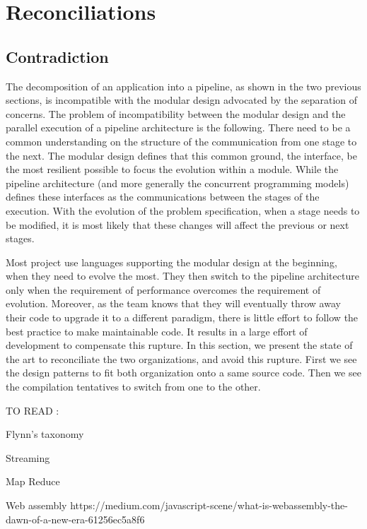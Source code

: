 







\section{Reconciliations} \label{chapter3:reconciliations}

\subsection{Contradiction}

The decomposition of an application into a pipeline, as shown in the two previous sections, is incompatible with the modular design advocated by the separation of concerns.
The problem of incompatibility between the modular design and the parallel execution of a pipeline architecture is the following.
There need to be a common understanding on the structure of the communication from one stage to the next.
The modular design defines that this common ground, the interface, be the most resilient possible to focus the evolution within a module.
While the pipeline architecture (and more generally the concurrent programming models) defines these interfaces as the communications between the stages of the execution.
With the evolution of the problem specification, when a stage needs to be modified, it is most likely that these changes will affect the previous or next stages.

Most project use languages supporting the modular design at the beginning, when they need to evolve the most.
They then switch to the pipeline architecture only when the requirement of performance overcomes the requirement of evolution.
Moreover, as the team knows that they will eventually throw away their code to upgrade it to a different paradigm, there is little effort to follow the best practice to make maintainable code.
It results in a large effort of development to compensate this rupture.
In this section, we present the state of the art to reconciliate the two organizations, and avoid this rupture.
First we see the design patterns to fit both organization onto a same source code.
Then we see the compilation tentatives to switch from one to the other.










TO READ :

Flynn's taxonomy
\cite{Flynn1972}

Streaming
\cite{Madsen2015}
\cite{Sun2015}

Map Reduce
\cite{Yao2015}


Web assembly
https://medium.com/javascript-scene/what-is-webassembly-the-dawn-of-a-new-era-61256ec5a8f6